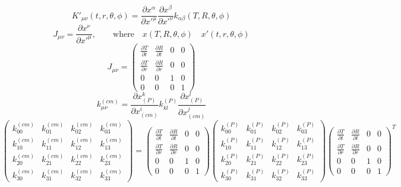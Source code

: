 \documentclass[10pt,letterpaper]{article}
\begin{document}
\begin{equation}
K'_{\mu\nu}(t,r,\theta,\phi) = \frac{\partial x^\alpha}{\partial x'^\mu}\frac{\partial x^\beta}{\partial x'^\nu} k_{\alpha\beta}(T,R,\theta,\phi)
\end{equation}
\begin{equation}
J_{\mu\nu} = \frac{\partial x^\nu}{\partial x'^\mu},\qquad\text{where}\quad x(T,R,\theta,\phi)\quad x'(t,r,\theta,\phi)
\end{equation}
\begin{equation}
\renewcommand*{\arraystretch}{1.5}
J_{\mu\nu} = 
\begin{pmatrix}
\frac{\partial T}{\partial t}&\frac{\partial R}{\partial t}&0&0\\
\frac{\partial T}{\partial r}&\frac{\partial R}{\partial r}&0&0\\
0&0&1&0\\
0&0&0&1
\end{pmatrix}
\end{equation}
\begin{equation}
k^{(cm)}_{\mu\nu} = \frac{\partial x_{(P)}^k}{\partial x_{(cm)}^i}k^{(P)}_{kl}\frac{\partial x_{(P)}^l}{\partial x_{(cm)}^j}
\end{equation}
\begin{equation}
\renewcommand*{\arraystretch}{1.5}
\begin{pmatrix}
k^{(cm)}_{00}&k^{(cm)}_{01}&k^{(cm)}_{02}&k^{(cm)}_{03}\\
k^{(cm)}_{10}&k^{(cm)}_{11}&k^{(cm)}_{12}&k^{(cm)}_{13}\\
k^{(cm)}_{20}&k^{(cm)}_{21}&k^{(cm)}_{22}&k^{(cm)}_{23}\\
k^{(cm)}_{30}&k^{(cm)}_{31}&k^{(cm)}_{32}&k^{(cm)}_{33} \end{pmatrix}
=
\begin{pmatrix}
\frac{\partial T}{\partial t}&\frac{\partial R}{\partial t}&0&0\\
\frac{\partial T}{\partial r}&\frac{\partial R}{\partial r}&0&0\\
0&0&1&0\\
0&0&0&1
\end{pmatrix}
\begin{pmatrix}
k^{(P)}_{00}&k^{(P)}_{01}&k^{(P)}_{02}&k^{(P)}_{03}\\
k^{(P)}_{10}&k^{(P)}_{11}&k^{(P)}_{12}&k^{(P)}_{13}\\
k^{(P)}_{20}&k^{(P)}_{21}&k^{(P)}_{22}&k^{(P)}_{23}\\
k^{(P)}_{30}&k^{(P)}_{31}&k^{(P)}_{32}&k^{(P)}_{33} 
\end{pmatrix}
\begin{pmatrix}
\frac{\partial T}{\partial t}&\frac{\partial R}{\partial t}&0&0\\
\frac{\partial T}{\partial r}&\frac{\partial R}{\partial r}&0&0\\
0&0&1&0\\
0&0&0&1
\end{pmatrix}^T
\end{equation}
\end{document}
